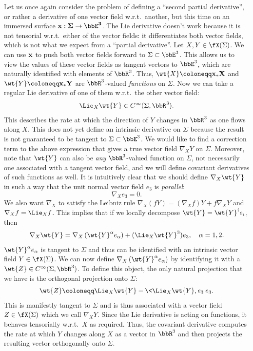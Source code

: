 \begin{rem}
    Let us once again consider the problem of defining a ``second partial derivative'', or rather a derivative of one vector field w.r.t.\ another, but this time on an immersed surface $\bf{x}:\Sigma\to \bbE^3$. The Lie derivative doesn't work because it is not tensorial w.r.t.\ either of the vector fields: it differentiates both vector fields, which is not what we expect from a ``partial derivative''. Let $X,Y\in\fX(\Sigma)$. We can use $\bf{x}$ to push both vector fields forward to $\Sigma\subset \bbE^3$. This allows us to view the values of these vector fields as tangent vectors to $\bbE^3$, which are naturally identified with elements of $\bbR^3$. Thus, $\wt{X}\coloneqq \bf{x}_\ast X$ and $\wt{Y}\coloneqq \bf{x}_\ast Y$ are $\bbR^3$-valued \emph{functions} on $\Sigma$. Now we can take a regular Lie derivative of one of them w.r.t.\ the other vector field:
    \[\Lie_X \wt{Y}\in C^\infty(\Sigma,\bbR^3).\]
    This describes the rate at which the direction of $Y$ changes in $\bbR^3$ as one flows along $X$. This does not yet define an intrinsic derivative on $\Sigma$ because the result is not guaranteed to be tangent to $\Sigma\subset \bbE^3$. We would like to find a correction term to the above expression that gives a true vector field $\nabla_X Y$ on $\Sigma$. Moreover, note that $\wt{Y}$ can also be \emph{any} $\bbR^3$-valued function on $\Sigma$, not necessarily one associated with a tangent vector field, and we will define covariant derivatives of such functions as well. It is intuitively clear that we should define $\nabla_X \wt{Y}$ in such a way that the unit normal vector field $e_3$ is \emph{parallel}:
    \[\nabla_X e_3=0.\]
    We also want $\nabla_X$ to satisfy the Leibniz rule $\nabla_X (fY)=(\nabla_X f)Y+f\nabla_X Y$ and $\nabla_X f=\Lie_X f$. This implies that if we locally decompose $\wt{Y}=\wt{Y}^i e_i$, then 
    \[\nabla_X \wt{Y}=\nabla_X\left(\wt{Y}^\alpha e_\alpha\right)+(\Lie_X\wt{Y}^3)e_3,\quad \alpha=1,2.\]
    $\wt{Y}^\alpha e_\alpha$ is tangent to $\Sigma$ and thus can be identified with an intrinsic vector field $Y\in\fX(\Sigma)$. We can now define $\nabla_X\left(\wt{Y}^\alpha e_\alpha\right)$ by identifying it with a $\wt{Z}\in C^\infty(\Sigma,\bbR^3)$. To define this object, the only natural projection that we have is the orthogonal projection onto $\Sigma$:
    \[\wt{Z}\coloneqq \Lie_X \wt{Y}-\<\Lie_X \wt{Y},e_3\>e_3.\]
    This is manifestly tangent to $\Sigma$ and is thus associated with a vector field $Z\in\fX(\Sigma)$ which we call $\nabla_X Y$. Since the Lie derivative is acting on functions, it behaves tensorially w.r.t.\ $X$ as required. Thus, the covariant derivative computes the rate at which $Y$ changes along $X$ as a vector in $\bbR^3$ and then projects the resulting vector orthogonally onto $\Sigma$.


\end{rem}
